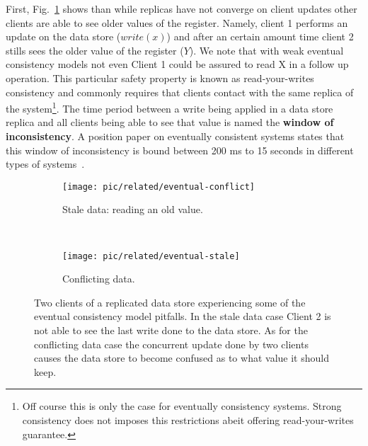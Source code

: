 First,  Fig.~\ref{fig:related:eventual-stale} shows than while replicas have not converge on client updates other clients are able to see older values of the register. 
Namely, client 1 performs an update on the data store ($write(x)$) and after an certain amount time client 2 stills sees the older value of the register ($Y$). 
We note that with weak eventual consistency models not even Client 1 could be assured to read X in a follow up operation. 
This particular safety property is known as read-your-writes consistency and commonly requires that clients contact with the same replica of the system\footnote{Off course this is only the case for eventually consistency systems. Strong consistency does not imposes this restrictions abeit offering read-your-writes guarantee.}. 
The time period between a write being applied in a data store replica and all clients being able to see that value is named the \textbf{window of inconsistency}.  A position paper on eventually consistent systems states that this window of inconsistency is bound between 200 ms to 15 seconds in different types of systems~\cite{bailis2013eventual}. 

\begin{figure}[ht]
  \centering
  \begin{subfigure}[b]{0.5\textwidth}
                \centering
                \texttt{[image: pic/related/eventual-conflict]}
                \caption{Stale data: reading an old value.}
                \label{fig:related:eventual-stale}
        \end{subfigure}%
        ~
        \begin{subfigure}[b]{0.5\textwidth}
                \centering
                \texttt{[image: pic/related/eventual-stale]}
                \caption{Conflicting data.}
                \label{fig:related:eventual-conflict}
        \end{subfigure}
  \caption[Eventual Consistency pitfalls]{Two clients of a replicated data store experiencing some of the eventual consistency model pitfalls. In the stale data case Client 2 is not able to see the last write done to the data store. As for the conflicting data case the concurrent update done  by two clients causes the data store to become confused as to what value it should keep.}
\label{fig:related:eventual}
\end{figure}

